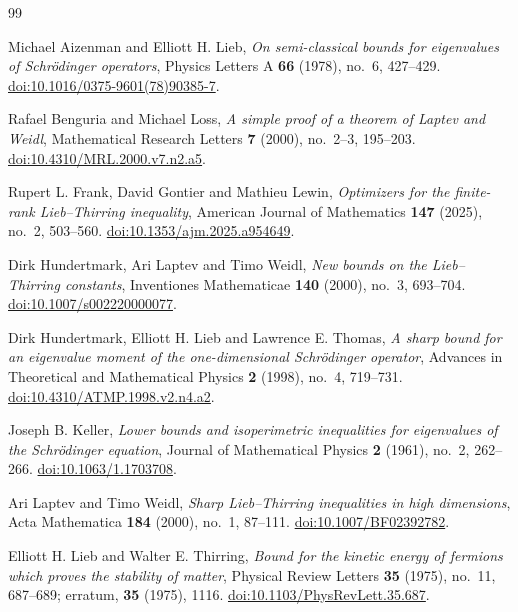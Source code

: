 \begin{thebibliography}{99}
\raggedright
{}
Michael Aizenman and Elliott H. Lieb,
\emph{On semi-classical bounds for eigenvalues of Schr\"odinger operators},
Physics Letters A \textbf{66} (1978), no.~6, 427--429.
\href{https://doi.org/10.1016/0375-9601(78)90385-7}{doi:10.1016/0375-9601(78)90385-7}.

Rafael Benguria and Michael Loss,
\emph{A simple proof of a theorem of Laptev and Weidl},
Mathematical Research Letters \textbf{7} (2000), no.~2--3, 195--203.
\href{https://doi.org/10.4310/MRL.2000.v7.n2.a5}{doi:10.4310/MRL.2000.v7.n2.a5}.

Rupert L. Frank, David Gontier and Mathieu Lewin,
\emph{Optimizers for the finite-rank Lieb--Thirring inequality},
American Journal of Mathematics \textbf{147} (2025), no.~2, 503--560.
\href{https://doi.org/10.1353/ajm.2025.a954649}{doi:10.1353/ajm.2025.a954649}.

Dirk Hundertmark, Ari Laptev and Timo Weidl,
\emph{New bounds on the Lieb--Thirring constants},
Inventiones Mathematicae \textbf{140} (2000), no.~3, 693--704.
\href{https://doi.org/10.1007/s002220000077}{doi:10.1007/s002220000077}.

Dirk Hundertmark, Elliott H. Lieb and Lawrence E. Thomas,
\emph{A sharp bound for an eigenvalue moment of the one-dimensional
Schr\"odinger operator},
Advances in Theoretical and Mathematical Physics \textbf{2} (1998), no.~4,
719--731.
\href{https://doi.org/10.4310/ATMP.1998.v2.n4.a2}{doi:10.4310/ATMP.1998.v2.n4.a2}.

Joseph B. Keller,
\emph{Lower bounds and isoperimetric inequalities for eigenvalues of the
Schr\"odinger equation},
Journal of Mathematical Physics \textbf{2} (1961), no.~2, 262--266.
\href{https://doi.org/10.1063/1.1703708}{doi:10.1063/1.1703708}.

Ari Laptev and Timo Weidl,
\emph{Sharp Lieb--Thirring inequalities in high dimensions},
Acta Mathematica \textbf{184} (2000), no.~1, 87--111.
\href{https://doi.org/10.1007/BF02392782}{doi:10.1007/BF02392782}.

Elliott H. Lieb and Walter E. Thirring,
\emph{Bound for the kinetic energy of fermions which proves the stability
of matter},
Physical Review Letters \textbf{35} (1975), no.~11, 687--689;
erratum, \textbf{35} (1975), 1116.
\href{https://doi.org/10.1103/PhysRevLett.35.687}{doi:10.1103/PhysRevLett.35.687}.


\end{thebibliography}
